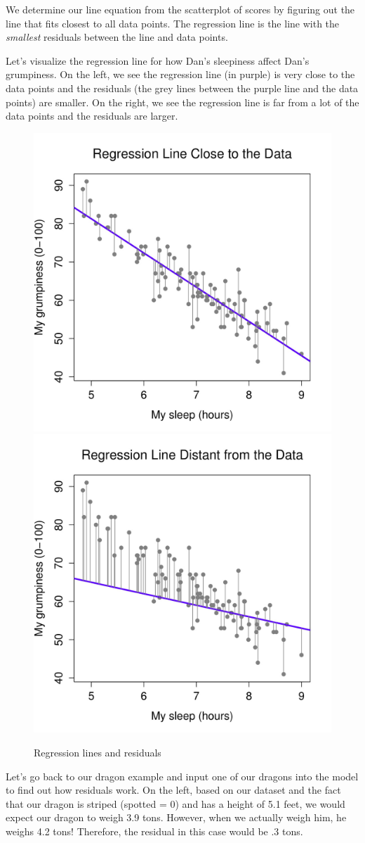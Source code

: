 \documentclass[
]{book}
\begin{document}
We determine our line equation from the scatterplot of scores by figuring out the line that fits closest to all data points. The regression line is the line with the \emph{smallest} residuals between the line and data points.

Let's visualize the regression line for how Dan's sleepiness affect Dan's grumpiness. On the left, we see the regression line (in purple) is very close to the data points and the residuals (the grey lines between the purple line and the data points) are smaller. On the right, we see the regression line is far from a lot of the data points and the residuals are larger.

\begin{figure}

{\centering \includegraphics[width=0.49\linewidth]{images/13-regression/good-regression-line} \includegraphics[width=0.49\linewidth]{images/13-regression/bad-regression-line} 

}

\caption{Regression lines and residuals}\label{fig:unnamed-chunk-2}
\end{figure}

Let's go back to our dragon example and input one of our dragons into the model to find out how residuals work. On the left, based on our dataset and the fact that our dragon is striped (spotted = 0) and has a height of 5.1 feet, we would expect our dragon to weigh 3.9 tons. However, when we actually weigh him, he weighs 4.2 tons! Therefore, the residual in this case would be .3 tons.
\end{document}
